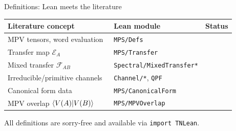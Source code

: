 \documentclass[aspectratio=169,10pt]{beamer}
\newcommand{\cE}{\mathcal{E}}
\newcommand{\cF}{\mathcal{F}}
\begin{document}
\begin{frame}{Definitions: Lean meets the literature}
    \vspace{-0.7em}

    \renewcommand{\arraystretch}{1.15}
    \begin{tabular}{p{} p{} p{}}
        \toprule
        \textbf{Literature concept} & \textbf{Lean module}             & \textbf{Status} \\
        \midrule
        \rowcolor{cardbg}
        MPV tensors, word evaluation~\cite{Perez-Garcia2007Matrix,Cirac2021Matrix}
                                    & \texttt{MPS/Defs}                & \proved{}       \\
        \rowcolor{cardbg}
        Transfer map $\cE_A$~\cite{Cirac2017Annals,Wolf2012Quantum}
                                    & \texttt{MPS/Transfer}            & \proved{}       \\
        \rowcolor{cardbg}
        Mixed transfer $\cF_{AB}$~\cite{Perez-Garcia2007Matrix}
                                    & \texttt{Spectral/MixedTransfer*} & \proved{}       \\
        \rowcolor{cardbg}
        Irreducible/primitive channels~\cite{Evans1978Spectral,Wolf2012Quantum}
                                    & \texttt{Channel/*}, \texttt{QPF} & \proved{}       \\
        \rowcolor{cardbg}
        Canonical form data~\cite{Cirac2021Matrix}
                                    & \texttt{MPS/CanonicalForm}       & \proved{}       \\
        \rowcolor{cardbg}
        MPV overlap $\braket{V(A)|V(B)}$
                                    & \texttt{MPS/MPVOverlap}          & \proved{}       \\
        \bottomrule
    \end{tabular}

    \vspace{0.3em}
    \textcolor{dimwhite}{\footnotesize All definitions are sorry-free and available via \texttt{import TNLean}.}
\end{frame}
\end{document}
